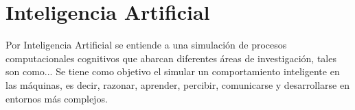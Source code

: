 \documentclass[12pt, a4paper, titlepage]{report}
\begin{document}
		\section{Inteligencia Artificial}
		Por Inteligencia Artificial se entiende a una simulación de procesos computacionales cognitivos que abarcan diferentes áreas de investigación, tales son como...
		Se tiene como objetivo el simular un comportamiento inteligente en las máquinas, es decir, razonar, aprender, percibir, comunicarse y desarrollarse en entornos más complejos.
\end{document}
